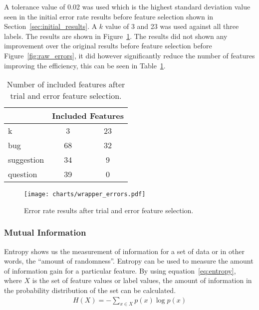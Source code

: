 A tolerance value of 0.02 was used which is the highest standard deviation value seen in the initial error rate results before
feature selection shown in Section~\ref{sec:initial_results}. A $k$ value of 3 and 23 was used against all three labels. The
results are shown in Figure~\ref{fig:trialerror_errors}. The results did not shown any improvement over the original results
before feature selection before Figure~\ref{fig:raw_errors}, it did however significantly reduce the number of features
improving the efficiency, this can be seen in Table~\ref{tbl:trialerror_inc_features}.

\begin{table}[h]
    \centering
    \begin{tabular}{l|c|c}
                   & \multicolumn{2}{l}{Included Features} \\
        \hline
        k          & 3                 & 23                \\
        \hline
        bug        & 68                & 32                \\
        suggestion & 34                & 9                 \\
        question   & 39                & 0                 \\
        \hline
    \end{tabular}
    \caption{Number of included features after trial and error feature selection.}
    \label{tbl:trialerror_inc_features}
\end{table}

\begin{figure}[h]
    \centering
    \texttt{[image: charts/wrapper\_errors.pdf]}
    \caption{Error rate results after trial and error feature selection.}
    \label{fig:trialerror_errors}
\end{figure}

\subsubsection{Mutual Information}
\label{sec:mutual_informaton}
Entropy shows us the measurement of information for a set of data or in other words, the ``amount of randomness''. Entropy can
be used to measure the amount of information gain for a particular feature. By using equation~\ref{eq:entropy}, where $X$ is the
set of feature values or label values, the amount of information in the probability distribution of the set can be calculated.
\begin{align}
    \label{eq:entropy}
    H(X) = -\sum_{x \in X} p(x) \log p(x)
\end{align}

